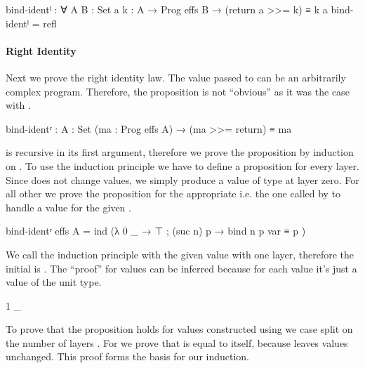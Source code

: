 \begin{code}
bind-identˡ : ∀ {A B : Set} {a} {k : A → Prog effs B} →
  (return a >>= k) ≡ k a
bind-identˡ = refl
\end{code}

\paragraph{Right Identity}
Next we prove the right identity law.
The value passed to \AgdaFunction{>>=} can be an
arbitrarily complex program.
Therefore, the proposition is not ``obvious'' as it was the case with
.

\begin{AgdaAlign}
\begin{code}
bind-identʳ : {A : Set} (ma : Prog effs A) → (ma >>= return) ≡ ma
\end{code}
\AgdaFunction{>>=} is recursive in its first argument, therefore we prove the
proposition by induction on .
To use the induction principle we have to define a proposition for every layer.
Since \AgdaFunction{>>=} does not change values, we simply produce a value of
type  at layer zero.
For all other we prove the proposition for the appropriate
 i.e. the one called by  to handle a value
for the given .

\begin{code}
bind-identʳ {effs} {A} = ind (λ{ 0 _ → ⊤ ; (suc n) p → bind n p var ≡ p })
\end{code}
We call the induction principle with the given value with one layer, therefore
the initial  is .
The ``proof'' for values can be inferred because for each value it's just a
value of the unit type.

\begin{code}
  1 _
\end{code}
To prove that the proposition holds for values constructed using
 we case split on the number of layers
.
For  we prove that
\AgdaSpace{} is equal to itself,
because \AgdaFunction{>>=} leaves values unchanged.
This proof forms the basis for our induction.


\end{AgdaAlign}
